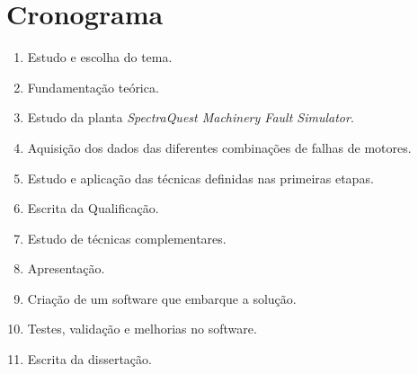 
\chapter{Cronograma}

\begin{enumerate}
	\item \label{escolhatema} Estudo e escolha do tema.
	\item \label{refteorico} Fundamentação teórica.
	\item \label{planta} Estudo da planta \textit{SpectraQuest Machinery Fault Simulator}.
	\item \label{aquisicao} Aquisição dos dados das diferentes combinações de falhas de motores.
	\item \label{apply} Estudo e aplicação das técnicas definidas nas primeiras etapas.
	\item \label{writei} Escrita da Qualificação.
	\item \label{estudo} Estudo de técnicas complementares.
	\item \label{presentation} Apresentação.
	\item \label{software} Criação de um software que embarque a solução.
	\item \label{validacao} Testes, validação e melhorias no software.
	\item \label{writeii} Escrita da dissertação.
\end{enumerate}

